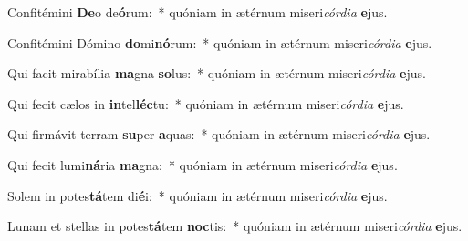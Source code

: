 \item Confitémini \textbf{De}o de\textbf{ó}rum:~* quóniam in ætérnum miseri\textit{cór}\textit{di}\textit{a} \textbf{e}jus.
\item Confitémini Dómino \textbf{do}mi\textbf{nó}rum:~* quóniam in ætérnum miseri\textit{cór}\textit{di}\textit{a} \textbf{e}jus.
\item Qui facit mirabília \textbf{ma}gna \textbf{so}lus:~* quóniam in ætérnum miseri\textit{cór}\textit{di}\textit{a} \textbf{e}jus.
\item Qui fecit cælos in \textbf{in}tel\textbf{léc}tu:~* quóniam in ætérnum miseri\textit{cór}\textit{di}\textit{a} \textbf{e}jus.
\item Qui firmávit terram \textbf{su}per \textbf{a}quas:~* quóniam in ætérnum miseri\textit{cór}\textit{di}\textit{a} \textbf{e}jus.
\item Qui fecit lumi\textbf{ná}ria \textbf{ma}gna:~* quóniam in ætérnum miseri\textit{cór}\textit{di}\textit{a} \textbf{e}jus.
\item Solem in potes\textbf{tá}tem di\textbf{é}i:~* quóniam in ætérnum miseri\textit{cór}\textit{di}\textit{a} \textbf{e}jus.
\item Lunam et stellas in potes\textbf{tá}tem \textbf{noc}tis:~* quóniam in ætérnum miseri\textit{cór}\textit{di}\textit{a} \textbf{e}jus.
